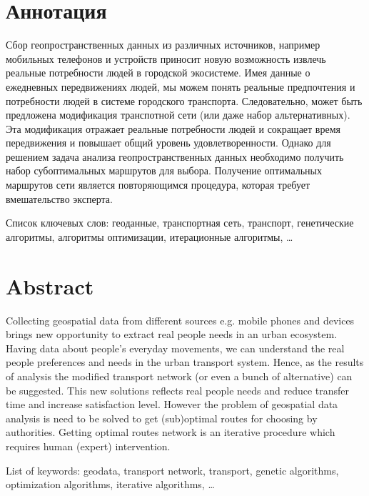 \tocless\part{Аннотация}
Сбор геопространственных данных из различных источников, например мобильных телефонов и устройств приносит 
новую возможность извлечь реальные потребности людей в городской экосистеме. Имея данные о ежедневных 
передвижениях людей, мы можем понять реальные предпочтения и потребности людей в системе городского 
транспорта. Следовательно, может быть предложена модификация транспотной сети (или даже набор 
альтернативных). Эта модификация отражает реальные потребности людей и сокращает время передвижения и 
повышает общий уровень удовлетворенности. Однако для решением задача анализа геопространственных данных 
необходимо получить набор субоптимальных маршрутов для выбора. Получение оптимальных маршрутов сети 
является повторяющимся процедура, которая требует вмешательство эксперта.

Список ключевых слов: геоданные, транспортная сеть, транспорт, генетические алгоритмы, 
алгоритмы оптимизации, итерационные алгоритмы, \ldots

\tocless\part{Abstract}
Collecting geospatial data from different sources e.g. mobile phones and devices brings new opportunity to 
extract real people needs in an urban ecosystem. Having data about people's everyday movements, we can 
understand the real people preferences and needs in the urban transport system. Hence, as the results of 
analysis the modified transport network (or even a bunch of alternative) can be suggested. This new 
solutions reflects real people needs and reduce transfer time and increase satisfaction level. However the 
problem of geospatial data analysis is need to be solved to get (sub)optimal routes for choosing by 
authorities. Getting optimal routes network is an iterative procedure which requires human (expert) 
intervention.

List of keywords: geodata, transport network, transport, genetic algorithms, optimization algorithms,
iterative algorithms, \ldots